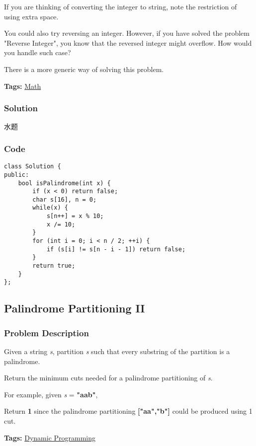 \documentclass{article}
\begin{document}
\begin{CJK*}{UTF8}{gkai}
If you are thinking of converting the integer to string, note the restriction of using extra space.

You could also try reversing an integer. However, if you have solved the problem "Reverse Integer", you know that the reversed integer might overflow. How would you handle such case?

There is a more generic way of solving this problem.


\textbf{Tags: }
\hyperref[ Math ]{ Math }



\subsubsection*{Solution}
水题

\subsubsection*{Code}
\begin{lstlisting}
class Solution {
public:
    bool isPalindrome(int x) {
        if (x < 0) return false;
        char s[16], n = 0;
        while(x) {
            s[n++] = x % 10;
            x /= 10;
        }
        for (int i = 0; i < n / 2; ++i) {
            if (s[i] != s[n - i - 1]) return false;
        }
        return true;
    }
}; 
\end{lstlisting}


\subsection{ Palindrome Partitioning II }
\label{ Palindrome Partitioning II }

\subsubsection*{Problem Description}
Given a string \emph{s}, partition \emph{s} such that every substring of the partition is a palindrome.

Return the minimum cuts needed for a palindrome partitioning of \emph{s}.

For example, given \emph{s} = \textbf{"aab"},


Return \textbf{1} since the palindrome partitioning \textbf{["aa","b"]} could be produced using 1 cut.


\textbf{Tags: }
\hyperref[ Dynamic Programming ]{ Dynamic Programming }



\end{CJK*}
\end{document}
